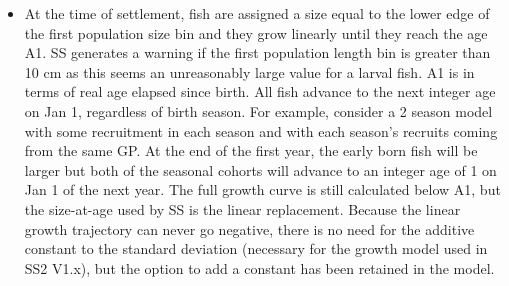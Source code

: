 \begin{itemize}
		\item At the time of settlement, fish are assigned a size equal to the lower edge of the first population size bin and they grow linearly until they reach the age A1.  SS generates a warning if the first population length bin is greater than 10 cm as this seems an unreasonably large value for a larval fish.  A1 is in terms of real age elapsed since birth.  All fish advance to the next integer age on Jan 1, regardless of birth season.  For example, consider a 2 season model with some recruitment in each season and with each season’s recruits coming from the same GP.  At the end of the first year, the early born fish will be larger but both of the seasonal cohorts will advance to an integer age of 1 on Jan 1 of the next year.  The full growth curve is still calculated below A1, but the size-at-age used by SS is the linear replacement.  Because the linear growth trajectory can never go negative, there is no need for the additive constant to the standard deviation (necessary for the growth model used in SS2 V1.x), but the option to add a constant has been retained in the model.
	\end{itemize}
	
